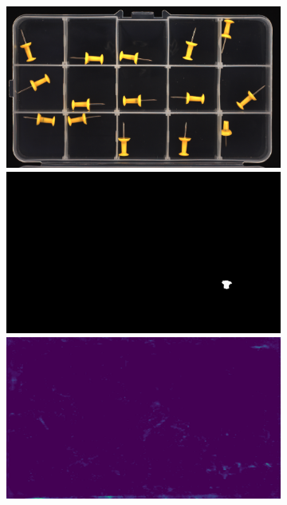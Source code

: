\begin{figure}[H]
\begin{subfigure}[b]{\textwidth}
\begin{minipage}{0.45\textwidth}
        \end{minipage}
        \begin{minipage}{0.45\textwidth}
            \centering
            \includegraphics[width=\textwidth]{figures/appendix/appendix_DRAEM/PP/s010.png}
            \includegraphics[width=\textwidth]{figures/appendix/appendix_DRAEM/PP/s10m.png}
            \includegraphics[width=\textwidth]{figures/appendix/appendix_DRAEM/PP/structural10_mask.png}
        \end{minipage}
    \end{subfigure}


\end{figure}

